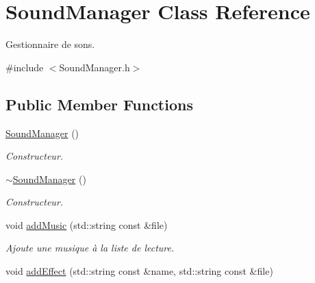 \hypertarget{classSoundManager}{\section{Sound\-Manager Class Reference}
\label{classSoundManager}
}


Gestionnaire de sons.  




{\ttfamily \#include $<$Sound\-Manager.\-h$>$}

\subsection*{Public Member Functions}
\begin{DoxyCompactItemize}
\item 
\hypertarget{classSoundManager_abcc1fbf3488be5788a42c9a4fe56df35}{\hyperlink{classSoundManager_abcc1fbf3488be5788a42c9a4fe56df35}{Sound\-Manager} ()}\label{classSoundManager_abcc1fbf3488be5788a42c9a4fe56df35}

\begin{DoxyCompactList}\small\item\em Constructeur. \end{DoxyCompactList}\item 
\hypertarget{classSoundManager_ad5dbf8eab22db48ff8f3db51b02f8938}{\hyperlink{classSoundManager_ad5dbf8eab22db48ff8f3db51b02f8938}{$\sim$\-Sound\-Manager} ()}\label{classSoundManager_ad5dbf8eab22db48ff8f3db51b02f8938}

\begin{DoxyCompactList}\small\item\em Constructeur. \end{DoxyCompactList}\item 
\hypertarget{classSoundManager_a6dcfd41960f3034460c601b04a1a1eb7}{void \hyperlink{classSoundManager_a6dcfd41960f3034460c601b04a1a1eb7}{add\-Music} (std\-::string const \&file)}\label{classSoundManager_a6dcfd41960f3034460c601b04a1a1eb7}

\begin{DoxyCompactList}\small\item\em Ajoute une musique à la liste de lecture. \end{DoxyCompactList}\item 
\hypertarget{classSoundManager_adf63b6806ffcc147633d5c3982b3f2ff}{void \hyperlink{classSoundManager_adf63b6806ffcc147633d5c3982b3f2ff}{add\-Effect} (std\-::string const \&name, std\-::string const \&file)}\label{classSoundManager_adf63b6806ffcc147633d5c3982b3f2ff}


\end{DoxyCompactItemize}
